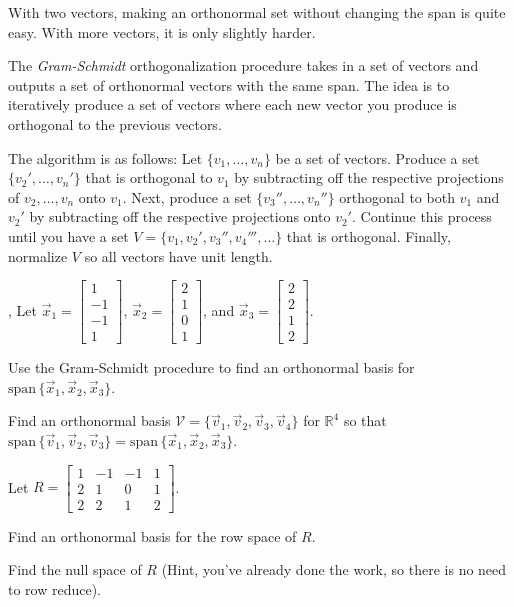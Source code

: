 \documentclass{article}
\newcommand{\R}{\mathbb{R}}
\renewcommand{\span}{\mathrm{span}\,}
\newcommand{\mat}[1]{\begin{bmatrix}#1\end{bmatrix}}
\begin{document}
	With two vectors, making an orthonormal set without changing the span
	is quite easy.  With more vectors, it is only slightly harder.

	\begin{Def}
		The \emph{Gram-Schmidt} orthogonalization procedure
		takes in a set of vectors and outputs a set of orthonormal vectors
		with the same span.  The idea is to iteratively produce a set of
		vectors where each new vector you produce is orthogonal to the previous vectors.

		The algorithm is as follows: Let $\{ v_1,\ldots, v_n\}$ be a set of 
		vectors.  Produce a set $\{ v_2',\ldots, v_n'\}$ that is orthogonal
		to $ v_1$ by subtracting off the respective projections
		of $ v_2,\ldots, v_n$
		onto $ v_1$.  Next, produce a set $\{ v_3'',\ldots, v_n''\}$
		orthogonal to both $ v_1$ and $ v_2'$ by subtracting off the
		respective projections
		onto $ v_2'$.  Continue this process until you have a set
		$V=\{ v_1, v_2', v_3'', v_4''',\ldots\}$ that is orthogonal.
		Finally, normalize $V$ so all vectors have unit length.
	\end{Def}

	\sep
	Let $\vec x_1=\mat{1\\-1\\-1\\1}$, $\vec x_2=\mat{2\\1\\0\\1}$, and 
	$\vec x_3=\mat{2\\2\\1\\2}$.
	\begin{Enum}
		\item Use the Gram-Schmidt procedure to find an orthonormal basis for 
			$\span\{\vec x_1,\vec x_2,\vec x_3\}$.
		\item Find an orthonormal basis $\mathcal V=\{\vec v_1,\vec v_2,\vec v_3,\vec v_4\}$
			for $\R^4$ so that $\span\{\vec v_1,\vec v_2,\vec v_3\}=
			\span\{\vec x_1,\vec x_2,\vec x_3\}$.
	\end{Enum}
	Let $R=\mat{1&-1&-1&1\\2&1&0&1\\2&2&1&2}$.
	\begin{Enum}[resume]
		\item Find an orthonormal basis for the row space of $R$.
		\item Find the null space of $R$ (Hint, you've already done the work, so
			there is no need to row reduce).
	\end{Enum}
\end{document}
